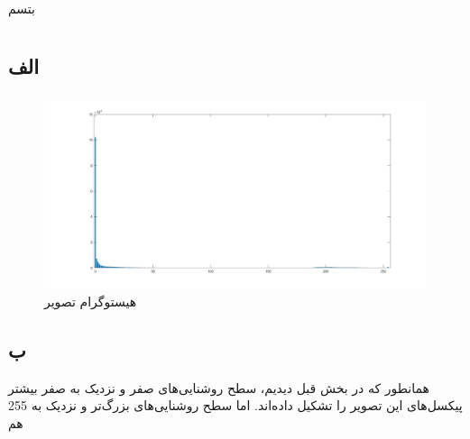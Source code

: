 \documentclass{article}
\begin{document}
\subsection{}
\begin{latin}

\end{latin}


\section{}%
بتسم


\section{}%
\subsection{الف}
\subsubsection{}
\begin{latin}

\end{latin}
\subsubsection{}
\begin{latin}

\end{latin}
\begin{figure}[H]
    \centering
    \includegraphics[width=1\textwidth]{figures/p6a.jpg}
    \caption
	{
هیستوگرام تصویر 
	}
    \label{fig:fig1}
\end{figure}


\subsection{ب}
همانطور که در بخش قبل دیدیم، سطح روشنایی‌های صفر و نزدیک به صفر بیشتر پیکسل‌های این تصویر را تشکیل داده‌اند. اما سطح روشنایی‌های بزرگ‌تر و نزدیک به 255 هم 
\end{document}
